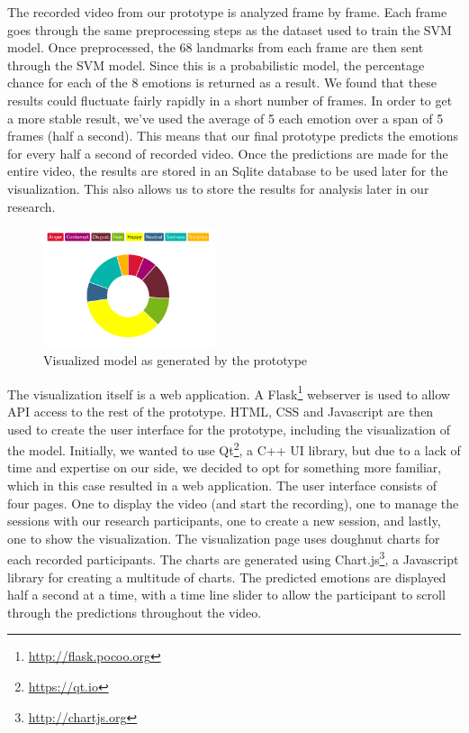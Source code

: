 \documentclass[sigconf]{acmart}
\begin{document}
The recorded video from our prototype is analyzed frame by frame. Each frame goes through the same preprocessing
steps as the dataset used to train the SVM model. Once preprocessed, the 68 landmarks from each frame are then
sent through the SVM model. Since this is a probabilistic model, the percentage chance for each of the 8 emotions
is returned as a result. We found that these results could fluctuate fairly rapidly in a short number of frames.
In order to get a more stable result, we've used the average of 5 each emotion over a span of 5 frames (half a
second). This means that our final prototype predicts the emotions for every half a second of recorded video.
Once the predictions are made for the entire video, the results are stored in an Sqlite database to be used
later for the visualization. This also allows us to store the results for analysis later in our research.

\begin{figure}[h]
    \centering
    \includegraphics[width=0.45\textwidth, scale=1]{visualization.png}
    \caption{Visualized model as generated by the prototype}
\end{figure}

The visualization itself is a web application. A Flask\footnote{\url{http://flask.pocoo.org}} webserver
is used to allow API access to the rest of the prototype. HTML, CSS and Javascript are then used to
create the user interface for the prototype, including the visualization of the model.
Initially, we wanted to use Qt\footnote{\url{https://qt.io}}, a C++ UI library, but due to a lack of time and
expertise on our side, we decided to opt for something more familiar, which in this case resulted in a web
application. The user interface consists of four pages. One to display the video (and start the recording),
one to manage the sessions with our research participants, one to create a new session, and lastly, one to
show the visualization. The visualization page uses doughnut charts for each recorded participants. The charts
are generated using Chart.js\footnote{\url{http://chartjs.org}}, a Javascript library for creating a multitude
of charts. The predicted emotions are displayed half a second at a time, with a time line slider to allow the
participant to scroll through the predictions throughout the video.
\end{document}

